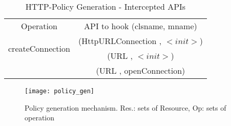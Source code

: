 \begin{table}[!htbp]
\caption{HTTP-Policy Generation - Intercepted APIs}
\label{tab:map}
\centering	
\begin{tabular}{@{}cc@{}} \toprule
Operation & API to hook (clsname, mname) \\
\cmidrule(l){1-2}
\multirow{2}{*}{createConnection} & (HttpURLConnection , $<init>$)  \\
 & (URL , $<init>$)  \\
 & (URL , openConnection) \\
\bottomrule
\end{tabular}
\end{table}


\begin{figure}[H]
\centering
\texttt{[image: policy\_gen]}
\caption{Policy generation mechanism. Res.: sets of Resource, Op: sets of operation}
\label{fig:genpolicy}
\end{figure}

